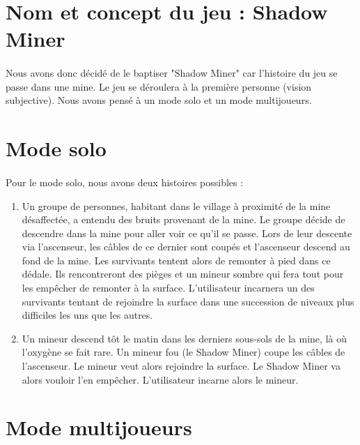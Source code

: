 \documentclass[titlepage, 13px, a4paper]{article}
\begin{document}
\section{Nom et concept du jeu : Shadow Miner}
\paragraph{} \hspace{0pt}
Nous avons donc décidé de le baptiser "Shadow Miner" car l’histoire du jeu se passe dans une mine.
Le jeu se déroulera à la première personne (vision subjective).
Nous avons pensé à un mode solo et un mode multijoueurs.

\section{Mode solo}
\paragraph{} \hspace{0pt}
Pour le mode solo, nous avons deux histoires possibles :
{\begin{enumerate}
	\item Un groupe de personnes, habitant dans le village à proximité de la mine désaffectée, 
		a entendu des bruits provenant de la mine. Le groupe décide de descendre dans la mine 
		pour aller voir ce qu’il se passe. Lors de leur descente via l’ascenseur, 
		les câbles de ce dernier sont coupés et l’ascenseur descend au fond de la mine. 
		Les survivants tentent alors de remonter à pied dans ce dédale. Ils rencontreront des pièges 
		et un mineur sombre qui fera tout pour les empêcher de remonter à la surface.
		L’utilisateur incarnera un des survivants tentant de rejoindre la surface dans une succession de niveaux plus difficiles les uns que les autres. \newpage
	
	\item Un mineur descend tôt le matin dans les derniers sous-sols de la mine, là où l’oxygène se fait rare. 
		Un mineur fou (le Shadow Miner) coupe les câbles de l’ascenseur. 
		Le mineur veut alors rejoindre la surface. Le Shadow Miner va alors vouloir l’en empêcher.
		L’utilisateur incarne alors le mineur. \\
\end{enumerate}}

\section{Mode multijoueurs}
\end{document}
